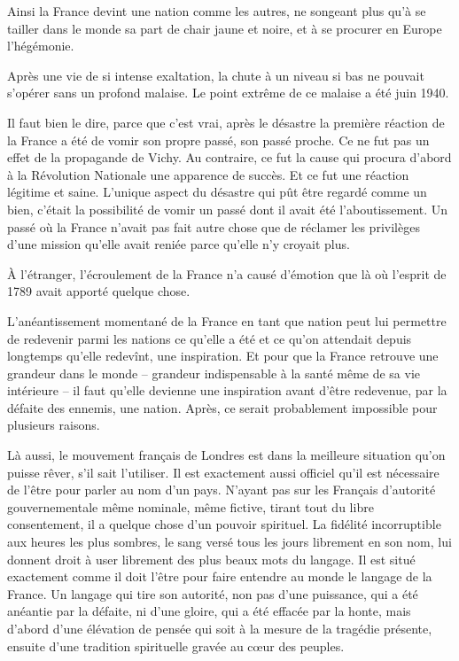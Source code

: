 \documentclass[french,twoside]{book} %
\begin{document}
\par
Ainsi la France devint une nation comme les autres, ne songeant plus qu'à se tailler dans le monde sa part de chair jaune et noire, et à se procurer en Europe l'hégémonie.\par
Après une vie de si intense exaltation, la chute à un niveau si bas ne pouvait s'opérer sans un profond malaise. Le point extrême de ce malaise a été juin 1940.\par
Il faut bien le dire, parce que c'est vrai, après le désastre la première réaction de la France a été de vomir son propre passé, son passé proche. Ce ne fut pas un effet de la propagande de Vichy. Au contraire, ce fut la cause qui procura d'abord à la Révolution Nationale une apparence de succès. Et ce fut une réaction légitime et saine. L'unique aspect du désastre qui pût être regardé comme un bien, c'était la possibilité de vomir un passé dont il avait été l'aboutissement. Un passé où la France n'avait pas fait autre chose que de réclamer les privilèges d'une mission qu'elle avait reniée parce qu'elle n'y croyait plus.\par
À l'étranger, l'écroulement de la France n'a causé d'émotion que là où l'esprit de 1789 avait apporté quelque chose.\par
L'anéantissement momentané de la France en tant que nation peut lui permettre de redevenir parmi les nations ce qu'elle a été et ce qu'on attendait depuis longtemps qu'elle redevînt, une inspiration. Et pour que la France retrouve une grandeur dans le monde – grandeur indispensable à la santé même de sa vie intérieure – il faut qu'elle devienne une inspiration avant d'être redevenue, par la défaite des ennemis, une nation. Après, ce serait probablement impossible pour plusieurs raisons.\par
Là aussi, le mouvement français de Londres est dans la meilleure situation qu'on puisse rêver, s'il sait l'utiliser. Il est exactement aussi officiel qu'il est nécessaire de l'être pour parler au nom d'un pays. N'ayant pas sur les Français d'autorité gouvernementale même nominale, même fictive, tirant tout du libre consentement, il a quelque chose d'un pouvoir spirituel. La fidélité incorruptible aux heures les plus sombres, le sang versé tous les jours librement en son nom, lui donnent droit à user librement des plus beaux mots du langage. Il est situé exactement comme il doit l'être pour faire entendre au monde le langage de la France. Un langage qui tire son autorité, non pas d'une puissance, qui a été anéantie par la défaite, ni d'une gloire, qui a été effacée par la honte, mais d'abord d'une élévation de pensée qui soit à la mesure de la tragédie présente, ensuite d'une tradition spirituelle gravée au cœur des peuples.\par
\end{document}

